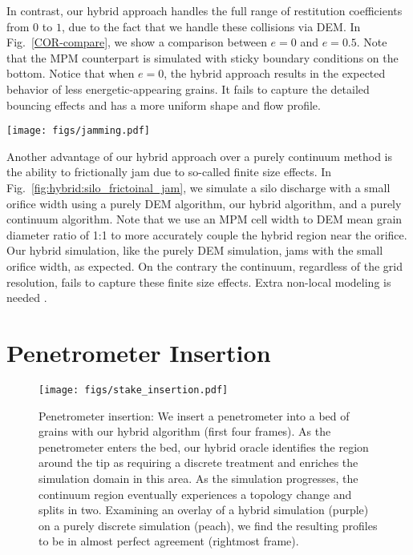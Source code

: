 In contrast, our hybrid approach handles the full range of restitution coefficients from $0$ to $1$, due to the fact that we handle these collisions via DEM. In Fig.~\ref{COR-compare}, we show a comparison between $e=0$ and $e=0.5$. Note that the MPM counterpart is simulated with sticky boundary conditions on the bottom. Notice that when $e=0$, the hybrid approach results in the expected behavior of less energetic-appearing grains. It fails to capture the detailed bouncing effects and has a more uniform shape and flow profile.
\begin{center}
  \centering
  \texttt{[image: figs/jamming.pdf]}
  \label{fig:hybrid:silo_frictoinal_jam}
\end{center}
Another advantage of our hybrid approach over a purely continuum method is the ability to frictionally
jam due to so-called finite size effects. In Fig.~\ref{fig:hybrid:silo_frictoinal_jam}, we simulate a silo discharge with a small orifice
width using a purely DEM algorithm, our hybrid algorithm, and a purely continuum algorithm. Note that we use an MPM cell width to DEM mean grain diameter ratio of 1:1 to more accurately couple the hybrid region near the orifice. Our hybrid simulation, like the purely DEM simulation, jams with the small orifice width, as expected. On the contrary the continuum, regardless of the grid resolution, fails to capture these finite size effects. Extra non-local modeling is needed \cite{Kamrin:2014}.

\section{Penetrometer Insertion}
\begin{figure}
  \centering
  \texttt{[image: figs/stake\_insertion.pdf]}
  \caption{
    Penetrometer insertion: We insert a penetrometer into a bed of grains with our hybrid algorithm (first four frames).
    As the penetrometer enters the bed, our hybrid oracle identifies the region around the tip as requiring a discrete
    treatment and enriches the simulation domain in this area. As the simulation progresses, the continuum region
    eventually experiences a topology change and splits in two. Examining an overlay of a hybrid simulation (purple) on a purely discrete simulation (peach), we find the resulting profiles to be in almost perfect agreement (rightmost frame).
  }
  \label{fig:hybrid:stake_insertion}
\end{figure}

